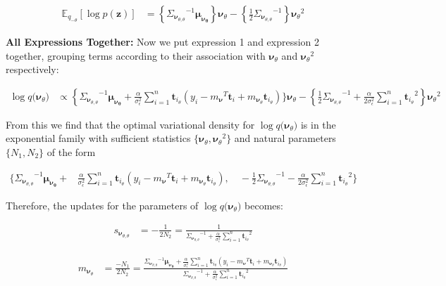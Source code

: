 \documentclass[letterpaper,12pt]{article}
\newcommand{\lc}{\left \{} %
\newcommand{\rc}{\right \}} %
\newcommand{\lp}{\left (} %
\newcommand{\rp}{\right )} %
\newcommand{\pz}{\ensuremath{p(\boldsymbol{z})}}
\newcommand{\sigmaepsilon}{\sigma_\epsilon^2} %
\newcommand{\nuv}{\boldsymbol{\nu}} %
\newcommand{\ti}{\boldsymbol{t}_i} %
\newcommand{\mnu}{\ensuremath{m_\nuv}} %
\newcommand{\qtheta}{\ensuremath{q(\boldsymbol{\nu}_\theta})}
\newcommand{\tthetatilde}{\ensuremath{\boldsymbol{t}_{i_\theta}}} %
\newcommand{\nutheta}{\ensuremath{\nuv_\theta}} %
\newcommand{\meannutheta}{\ensuremath{\boldsymbol{\mu_{\nuv_\theta}}}} %
\newcommand{\sigmanutheta}{\ensuremath{\Sigma_{\nuv_{\theta, \theta}}}}
\newcommand{\mnusub}[1]{\ensuremath{m_{\nuv_#1}}} %
\newcommand{\Etheta}{\ensuremath{\mathbb{E}_{q_{-\theta}}}} %
\newcommand{\el}{\left[} %
\newcommand{\er}{\right]} %
\begin{document}
\begin{equation}
\begin{split}
   \Etheta \el \log \pz \er &= \lc \sigmanutheta^{-1} \meannutheta \rc \nutheta - \lc \frac{1}{2} \sigmanutheta^{-1} \rc \nutheta^2
\end{split}
\end{equation}

\noindent \textbf{All Expressions Together:} Now we put expression 1 and expression 2 together, grouping terms according to their association with $\nutheta$ and $\nutheta^2$ respectively:

\begin{equation}
\begin{split}
    \log \qtheta &\propto \lc \sigmanutheta^{-1} \meannutheta + \frac{\alpha}{ \sigmaepsilon} \sum_{i=1}^n \tthetatilde \lp y_i - {\mnu}^T \ti + \mnusub{\theta} \tthetatilde \rp \Bigg\} \nutheta - \lc \frac{1}{2} \sigmanutheta^{-1} + \frac{\alpha}{2 \sigmaepsilon} \sum_{i=1}^n  \tthetatilde^2 \rc \nutheta^2
\end{split}
\end{equation}

From this we find that the optimal variational density for $\log \qtheta$ is in the exponential family with sufficient statistics $\{ \nutheta,\nutheta^2\}$ and natural parameters $\{N_1,N_2\}$ of the form

\begin{equation}
\begin{split}
    \Bigg\{ \sigmanutheta^{-1} \meannutheta + &\frac{\alpha}{ \sigmaepsilon} \sum_{i=1}^n \tthetatilde \lp y_i - {\mnu}^T \ti + \mnusub{\theta} \tthetatilde \rp , \quad - \frac{1}{2} \sigmanutheta^{-1} - \frac{\alpha}{2 \sigmaepsilon} \sum_{i=1}^n  \tthetatilde^2 \Bigg\}
\end{split}
\end{equation}

Therefore, the updates for the parameters of $\log \qtheta$ becomes:

\begin{equation}
\begin{split}
    s_{\nuv_{\theta, \theta}} &= - \frac{1}{2N_2} = \frac{1}{\sigmanutheta^{-1} + \frac{\alpha}{ \sigmaepsilon} \sum_{i=1}^n  \tthetatilde^2 }
\end{split}
\end{equation}

\begin{equation}
\begin{split}
    \mnusub{\theta} &= \frac{-N_1}{2N_2} = \frac{\sigmanutheta^{-1} \meannutheta + \frac{\alpha}{ \sigmaepsilon} \sum_{i=1}^n \tthetatilde \lp y_i - {\mnu}^T \ti + \mnusub{\theta} \tthetatilde \rp }{ \sigmanutheta^{-1} + \frac{\alpha}{ \sigmaepsilon} \sum_{i=1}^n \tthetatilde^2 }\\
\end{split}
\end{equation}
\end{document}
